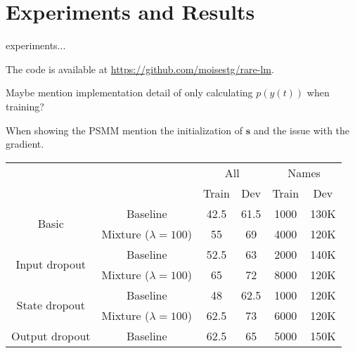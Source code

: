 \chapter{Experiments and Results}

experiments... 

The code is available at \url{https://github.com/moisestg/rare-lm}.

Maybe mention implementation detail of only calculating $p(y(t))$ when training?

When showing the PSMM mention the initialization of $\mathbf{s}$ and the issue with the gradient.

\begin{table}[]
	\centering
	\begin{tabular}{cc|c|c|c|c|}
		\cline{3-6}
		\multicolumn{1}{l}{}                                                    & \multicolumn{1}{l|}{}   & \multicolumn{2}{c|}{All} & \multicolumn{2}{c|}{Names} \\ \cline{3-6} 
		&                         & Train       & Dev        & Train        & Dev         \\ \hline
		\multicolumn{1}{|c|}{\multirow{2}{*}{Basic}}                            & Baseline                & 42.5        & 61.5       & 1000         & 130K        \\ \cline{2-6} 
		\multicolumn{1}{|c|}{}                                                  & Mixture ($\lambda=100$) & 55          & 69         & 4000         & 120K        \\ \hline
		\multicolumn{1}{|c|}{\multirow{2}{*}{Input dropout}}                    & Baseline                & 52.5        & 63         & 2000         & 140K        \\ \cline{2-6} 
		\multicolumn{1}{|c|}{}                                                  & Mixture ($\lambda=100$) & 65          & 72         & 8000         & 120K        \\ \hline
		\multicolumn{1}{|c|}{\multirow{2}{*}{State dropout}}                    & Baseline                & 48          & 62.5       & 1000         & 120K        \\ \cline{2-6} 
		\multicolumn{1}{|c|}{}                                                  & Mixture ($\lambda=100$) & 62.5        & 73         & 6000         & 120K        \\ \hline
		\multicolumn{1}{|c|}{\multirow{2}{*}{Output dropout}}                   & Baseline                & 62.5        & 65         & 5000         & 150K        \\ \cline{2-6} 

\end{tabular}
\end{table}
